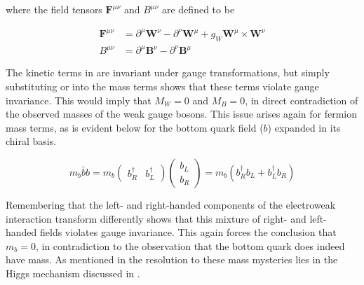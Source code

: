 where the field tensors $\boldsymbol{F}^{\mu\nu}$ and $B^{\mu\nu}$ are defined
to be

\begin{align}
\boldsymbol{F}^{\mu\nu}  &= \partial^{\mu}\boldsymbol{W}^{\nu} -
\partial^{\nu}\boldsymbol{W}^{\mu} + g_{W}\boldsymbol{W}^{\mu} \times
\boldsymbol{W}^{\nu} \\
B^{\mu\nu} &=  \partial^{\mu}\boldsymbol{B}^{\nu} -
\partial^{\nu}\boldsymbol{B}^{\mu}
\end{align}

The kinetic terms in  are invariant under
gauge transformations, but simply substituting  or
 into the mass terms shows that these terms violate gauge
invariance. This would imply that $M_{W} = 0$ and $M_{B} = 0$, in direct
contradiction of the observed masses of the weak gauge bosons.  This issue
arises again for fermion mass terms, as is evident below for the bottom quark field
($b$) expanded in its chiral basis.

\begin{equation}
m_{b}\bar{b}b = m_{b} \left( \begin{matrix}b^{\dagger}_{R} &
b^{\dagger}_{L} \end{matrix} \right) \left( \begin{matrix} b_{L}
\\ b_{R} \end{matrix} \right) = m_{b}(b^{\dagger}_{R}b_{L} +
b^{\dagger}_{L}b_{R})
\end{equation}

Remembering that the left- and right-handed components of the electroweak
interaction transform differently shows that this mixture of right- and left-
handed fields violates gauge invariance. This again forces the conclusion that
$m_{b} = 0$, in contradiction to the observation that the bottom quark does indeed
have mass. As mentioned in  the resolution to these
mass mysteries lies in the Higgs mechanism discussed in .
